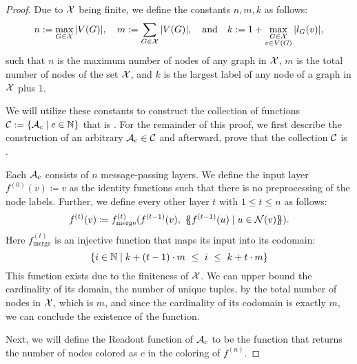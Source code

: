\begin{proof}
    Due to $\mathcal{X}$ being finite, we define the constants $n, m, k$ as follows:
    \begin{equation*}
        n := \max_{G \in \mathcal{X}} |V(G)|, \quad  m := \sum_{G \in \mathcal{X}} |V(G)|, \quad\text{and}\quad k := 1 + \max_{\substack{G \in \mathcal{X} \\ v \in V(G)}} |l_G(v)|,
    \end{equation*}
    such that $n$ is the maximum number of nodes of any graph in $\mathcal{X}$, $m$ is the total number of nodes of the set $\mathcal{X}$, and $k$ is the largest label of any node of a graph in $\mathcal{X}$ plus $1$.

    We will utilize these constants to construct the collection of functions $\mathcal{C} := \{ \mathcal{A}_c \mid c \in \mathbb{N} \}$ that is \wldisc. For the remainder of this proof, we first describe the construction of an arbitrary $\mathcal{A}_c \in \mathcal{C}$ and afterward, prove that the collection $\mathcal{C}$ is \wldisc.

    Each $\mathcal{A}_c$ consists of $n$ message-passing layers. We define the input layer $f^{(0)}(v) \coloneqq v$ as the identity functions such that there is no preprocessing of the node labels. Further, we define every other layer $t$ with $1 \leq t \leq n$ as follows:
    \begin{align*}
        f^{(t)}(v) \coloneqq f^{(t)}_{\text{merge}}(f^{(t-1)}(v), \ \MSopen f^{(t-1)}(u) \mid u \in \cN(v)\MSclose).
    \end{align*}
    Here $f^{(t)}_{\text{merge}}$ is an injective function that maps its input into its codomain:
    \begin{equation*}
       \{ i \in \Nb \mid k + (t-1) \cdot m \ \leq \  i \ \leq \ k + t \cdot m \}
    \end{equation*}
    This function exists due to the finiteness of $\mathcal{X}$. We can upper bound the cardinality of its domain, the number of unique tuples, by the total number of nodes in $\mathcal{X}$, which is $m$, and since the cardinality of its codomain is exactly $m$, we can conclude the existence of the function.

    Next, we will define the \textsf{Readout} function of $\mathcal{A}_c$ to be the function that returns the number of nodes colored as $c$ in the coloring of $f^{(n)}$.
    

\end{proof}
